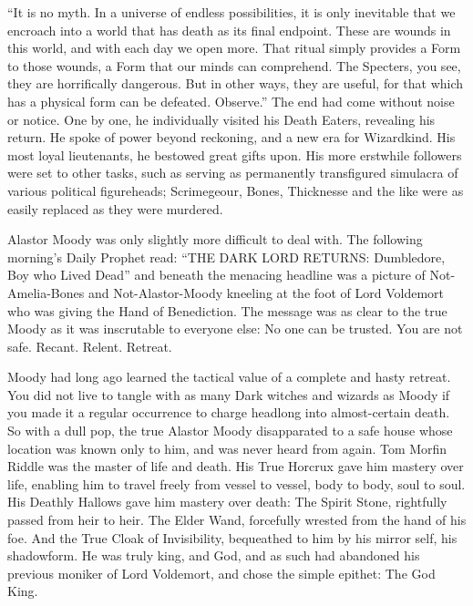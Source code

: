 “It is no myth. In a universe of endless possibilities, it is only inevitable that we encroach into a world that has death as its final endpoint. These are wounds in this world, and with each day we open more. That ritual simply provides a Form to those wounds, a Form that our minds can comprehend. The Specters, you see, they are horrifically dangerous. But in other ways, they are useful, for that which has a physical form can be defeated. Observe.”
\simpleline
{}
The end had come without noise or notice. One by one, he individually visited his Death Eaters, revealing his return. He spoke of power beyond reckoning, and a new era for Wizardkind. His most loyal lieutenants, he bestowed great gifts upon. His more erstwhile followers were set to other tasks, such as serving as permanently transfigured simulacra of various political figureheads; Scrimegeour, Bones, Thicknesse and the like were as easily replaced as they were murdered.

Alastor Moody was only slightly more difficult to deal with. The following morning’s Daily Prophet read: “THE DARK LORD RETURNS:  Dumbledore, Boy who Lived Dead”  and beneath the menacing headline was a picture of Not-Amelia-Bones and Not-Alastor-Moody kneeling at the foot of Lord Voldemort who was giving the Hand of Benediction. The message was as clear to the true Moody as it was inscrutable to everyone else: No one can be trusted. You are not safe. Recant. Relent. Retreat.

Moody had long ago learned the tactical value of a complete and hasty retreat. You did not live to tangle with as many Dark witches and wizards as Moody if you made it a regular occurrence to charge headlong into almost-certain death. So with a dull pop, the true Alastor Moody disapparated to a safe house whose location was known only to him, and was never heard from again.
\simpleline
Tom Morfin Riddle was the master of life and death. His True Horcrux gave him mastery over life, enabling him to travel freely from vessel to vessel, body to body, soul to soul. His Deathly Hallows gave him mastery over death: The Spirit Stone, rightfully passed from heir to heir. The Elder Wand, forcefully wrested from the hand of his foe. And the True Cloak of Invisibility, bequeathed to him by his mirror self, his shadowform. He was truly king, and God, and as such had abandoned his previous moniker of Lord Voldemort, and chose the simple epithet: The God King.

